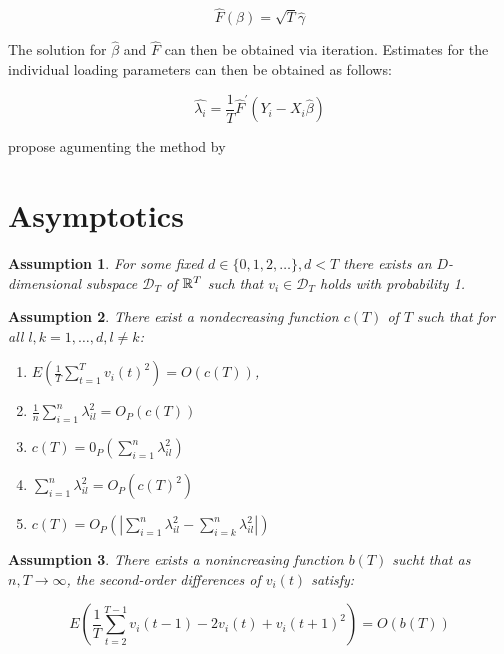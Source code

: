 \begin{equation}
    \hat{F}(\beta) = \sqrt{T}\hat{\gamma}
\end{equation}

The solution for $\hat{\beta}$ and $\hat{F}$ can then be obtained via iteration. Estimates for the individual loading parameters can then be obtained as follows:

\begin{equation}
    \hat{\lambda_i} = \frac{1}{T} \hat{F}^\prime (Y_i - X_i \hat{\beta}) 
\end{equation}


\citet{bada2014parameter} propose agumenting the method by \citet{bai2009panel} 



\section{Asymptotics}

\newtheorem{assumption}{Assumption}

\begin{assumption}
    For some fixed $d \in \{0,1,2,  \ldots\}, d < T$ there exists an $D$- dimensional subspace $\mathcal{D}_T$ of $\mathbb{R}^T$ such that $v_i \in \mathcal{D}_T$ holds with probability 1. 
\end{assumption}

\begin{assumption}
    There exist a nondecreasing function $c(T)$ of $T$ such that for all $l,k = 1, \ldots, d, l \neq k$:
        \begin{enumerate}
            \item $E( \frac{1}{T} \sum_{t=1}^T v_i(t)^2) = O(c(T))$,
            \item $\frac{1}{n} \sum_{i=1}^n \lambda_{il}^2 = O_P(c(T))$
            \item $c(T) = 0_P (\sum_{i=1}^n \lambda_{il}^2)$
            \item $\sum_{i=1}^n \lambda_{il}^2 = O_P(c(T)^2)$
            \item $c(T) = O_P( |\sum_{i=1}^n \lambda_{il}^2 - \sum_{i=k}^n \lambda_{il}^2|) $
            
        \end{enumerate}
    \end{assumption}

    \begin{assumption}
        There exists a nonincreasing function $b(T)$ sucht that as $n, T \to \infty$, the second-order differences of $v_i(t)$ satisfy:

        $$ E \left( \frac{1}{T} \sum_{t=2}^{T-1} v_i(t-1) - 2v_i(t) + v_i(t+1)^2 \right) = O(b(T))$$
    \end{assumption}

